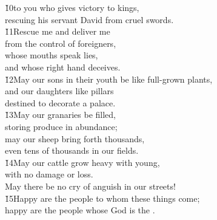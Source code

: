 \begin{poetry}
\poeml \v{10}to you who gives victory to kings, \\
\poemll    rescuing his servant David from cruel swords. \\
\poeml \v{11}Rescue me and deliver me \\
\poemll    from the control of foreigners, \\
\poeml whose mouths speak lies, \\
\poemll    and whose right hand deceives. \\
\poeml \v{12}May our sons in their youth be like full-grown plants, \\
\poemll    and our daughters like pillars \\
\poemlll       destined to decorate a palace. \\
\poeml \v{13}May our granaries be filled, \\
\poemll    storing produce in abundance; \\
\poeml may our sheep bring forth thousands, \\
\poemll    even tens of thousands in our fields. \\
\poeml \v{14}May our cattle grow heavy with young, \\
\poemll    with no damage or loss. \\
\poeml May there be no cry of anguish in our streets! \\
\poeml \v{15}Happy are the people to whom these things come; \\
\poemll    happy are the people whose God is the .
\end{poetry}

